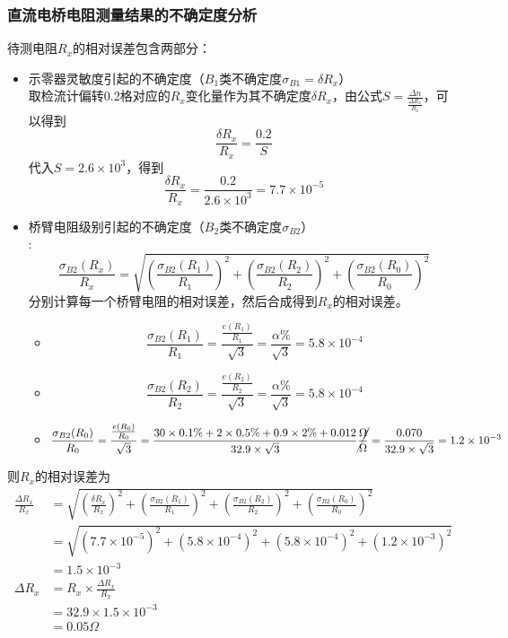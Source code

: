 \documentclass[12pt]{article}
\begin{document}
\subsubsection{直流电桥电阻测量结果的不确定度分析}
\vspace{1em}
待测电阻$R_x$的相对误差包含两部分：
\begin{itemize}
    \item 示零器灵敏度引起的不确定度（$B_1$类不确定度$\sigma_{B1}=\delta R_x$）\\
        取检流计偏转0.2格对应的$R_x$变化量作为其不确定度$\delta R_x$，由公式$S=\frac{\Delta n}{\frac{\Delta R_x}{R_x}}$，可以得到
        \begin{equation*}
            \frac{\delta R_x}{R_x} = \frac{0.2}{S}
        \end{equation*}
        代入$S=2.6\times 10^3$，得到
        \begin{equation*}
            \frac{\delta R_x}{R_x} = \frac{0.2}{2.6\times 10^3} = 7.7\times 10^{-5}
        \end{equation*}
    \item 桥臂电阻级别引起的不确定度（$B_2$类不确定度$\sigma_{B2}$）\\
    :\\
    \begin{equation*}
        \frac{\sigma_{B2}(R_x)}{R_x} = \sqrt{ (\frac{\sigma_{B2}(R_1)}{R_1})^2+(\frac{\sigma_{B2}(R_2)}{R_2})^2+(\frac{\sigma_{B2}(R_0)}{R_0})^2}
    \end{equation*}
    分别计算每一个桥臂电阻的相对误差，然后合成得到$R_x$的相对误差。
    \begin{itemize}
        \item
        \[
        \frac{\sigma_{B2}(R_1)}{R_1} = \frac{\frac{e(R_1)}{R_1}}{\sqrt{3}}=\frac{\alpha\%}{\sqrt{3}}=5.8\times10^{-4}
        \]
        \item 
        \[
        \frac{\sigma_{B2}(R_2)}{R_2} = \frac{\frac{e(R_2)}{R_2}}{\sqrt{3}}=\frac{\alpha\%}{\sqrt{3}}=5.8\times10^{-4}
        \]
        \item 
        \[
        \frac{\sigma_{B2}(R_0)}{R_0} = \frac{\frac{e(R_0)}{R_0}}{\sqrt{3}}=\frac{30\times0.1\%+2\times0.5\%+0.9\times2\%+0.012}{32.9\times\sqrt{3}}\cancel{\frac{\Omega}{\Omega}}=\frac{0.070}{32.9\times\sqrt{3}}=1.2\times10^{-3}
        \]
    \end{itemize}
\end{itemize}
则$R_x$的相对误差为
\begin{equation*}
\begin{aligned}
    \frac{\Delta R_x}{R_x} &= \sqrt{(\frac{\delta R_x}{R_x})^2+(\frac{\sigma_{B2}(R_1)}{R_1})^2+(\frac{\sigma_{B2}(R_2)}{R_2})^2+(\frac{\sigma_{B2}(R_0)}{R_0})^2} \\
    &= \sqrt{(7.7\times10^{-5})^2+(5.8\times10^{-4})^2+(5.8\times10^{-4})^2+(1.2\times10^{-3})^2} \\
    &= 1.5\times10^{-3} \\
    \Delta R_x &= R_x\times\frac{\Delta R_x}{R_x} \\
    &= 32.9\times1.5\times10^{-3} \\
    &= 0.05\Omega
\end{aligned}
\end{equation*}
\end{document}

